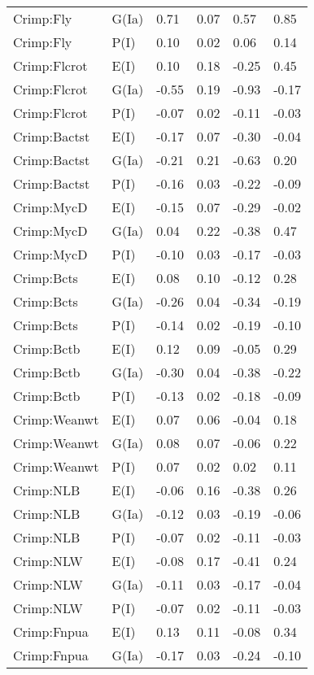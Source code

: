 \begin{center}
\begin{longtable}{|p{1.1in}|p{0.7in}|p{0.7in}|p{0.6in}|p{0.6in}|p{0.6in}|}
  Crimp:Fly & G(Ia) & 0.71 & 0.07 & 0.57 & 0.85 \\ 
  Crimp:Fly & P(I) & 0.10 & 0.02 & 0.06 & 0.14 \\ 
  Crimp:Flcrot & E(I) & 0.10 & 0.18 & -0.25 & 0.45 \\ 
  Crimp:Flcrot & G(Ia) & -0.55 & 0.19 & -0.93 & -0.17 \\ 
  Crimp:Flcrot & P(I) & -0.07 & 0.02 & -0.11 & -0.03 \\ 
  Crimp:Bactst & E(I) & -0.17 & 0.07 & -0.30 & -0.04 \\ 
  Crimp:Bactst & G(Ia) & -0.21 & 0.21 & -0.63 & 0.20 \\ 
  Crimp:Bactst & P(I) & -0.16 & 0.03 & -0.22 & -0.09 \\ 
  Crimp:MycD & E(I) & -0.15 & 0.07 & -0.29 & -0.02 \\ 
  Crimp:MycD & G(Ia) & 0.04 & 0.22 & -0.38 & 0.47 \\ 
  Crimp:MycD & P(I) & -0.10 & 0.03 & -0.17 & -0.03 \\ 
  Crimp:Bcts & E(I) & 0.08 & 0.10 & -0.12 & 0.28 \\ 
  Crimp:Bcts & G(Ia) & -0.26 & 0.04 & -0.34 & -0.19 \\ 
  Crimp:Bcts & P(I) & -0.14 & 0.02 & -0.19 & -0.10 \\ 
  Crimp:Bctb & E(I) & 0.12 & 0.09 & -0.05 & 0.29 \\ 
  Crimp:Bctb & G(Ia) & -0.30 & 0.04 & -0.38 & -0.22 \\ 
  Crimp:Bctb & P(I) & -0.13 & 0.02 & -0.18 & -0.09 \\ 
  Crimp:Weanwt & E(I) & 0.07 & 0.06 & -0.04 & 0.18 \\ 
  Crimp:Weanwt & G(Ia) & 0.08 & 0.07 & -0.06 & 0.22 \\ 
  Crimp:Weanwt & P(I) & 0.07 & 0.02 & 0.02 & 0.11 \\ 
  Crimp:NLB & E(I) & -0.06 & 0.16 & -0.38 & 0.26 \\ 
  Crimp:NLB & G(Ia) & -0.12 & 0.03 & -0.19 & -0.06 \\ 
  Crimp:NLB & P(I) & -0.07 & 0.02 & -0.11 & -0.03 \\ 
  Crimp:NLW & E(I) & -0.08 & 0.17 & -0.41 & 0.24 \\ 
  Crimp:NLW & G(Ia) & -0.11 & 0.03 & -0.17 & -0.04 \\ 
  Crimp:NLW & P(I) & -0.07 & 0.02 & -0.11 & -0.03 \\ 
  Crimp:Fnpua & E(I) & 0.13 & 0.11 & -0.08 & 0.34 \\ 
  Crimp:Fnpua & G(Ia) & -0.17 & 0.03 & -0.24 & -0.10 \\ 

\end{longtable}
\end{center}
